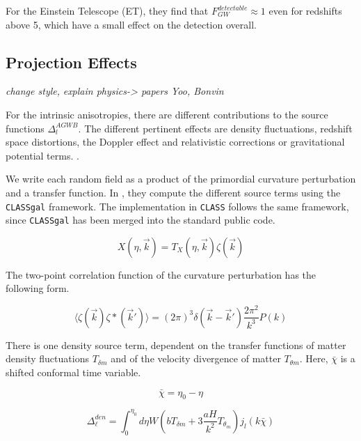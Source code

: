 For the Einstein Telescope (ET), they find that $F_{GW}^{detectable} \approx 1$ even for redshifts above 5, which have a small effect on the detection overall.

\subsection{Projection Effects}
\label{projection_effects}

\textit{change style,}
\textit{explain physics-> papers Yoo, Bonvin}

For the intrinsic anisotropies, there are different contributions to the source functions $\Delta_l^{AGWB}$. The different pertinent effects are density fluctuations, redshift space distortions, the Doppler effect and relativistic corrections or gravitational potential terms. \cite{di_dio_classgal_2013}.

We write each random field as a product of the primordial curvature perturbation and a transfer function. In \cite{dallarmi_dipole_2022}, they compute the different source terms using the {\tt CLASSgal} framework. The implementation in {\tt CLASS} follows the same framework, since {\tt CLASSgal} has been merged into the standard public code.

\begin{equation}
    X(\eta, \vec{k}) = T_X(\eta, \vec{k})\zeta(\vec{k})
\end{equation}

The two-point correlation function of the curvature perturbation has the following form.

\begin{equation}
    \langle \zeta(\vec{k})\zeta*(\vec{k}')\rangle = (2\pi)^3 \delta(\vec{k}-\vec{k}')\frac{2\pi^2}{k^3}P(k)
\end{equation}

There is one density source term, dependent on the transfer functions of matter density fluctuations $T_{\delta m}$ and of the velocity divergence of matter $T_{\theta m}$. Here, $\bar{\chi}$ is a shifted conformal time variable.

\begin{equation}
    \bar{\chi} = \eta_0 - \eta 
\end{equation}


\begin{equation}
    \Delta_\ell^{den}=\int_0^{\eta_0} d\eta W \left(b T_{\delta m} +3 \frac{aH}{k^2} T_{\theta_m}\right)j_l(k \bar{\chi})
\end{equation}

